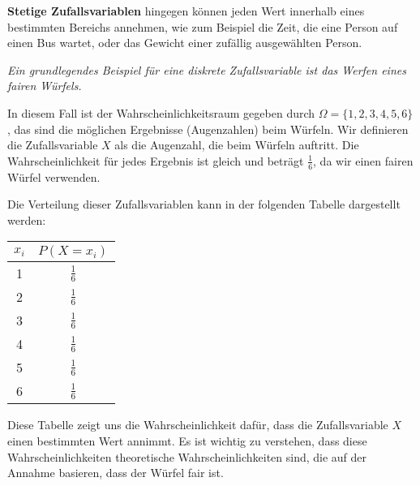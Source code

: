 \textbf{Stetige Zufallsvariablen} hingegen können jeden Wert innerhalb eines bestimmten Bereichs annehmen, wie zum Beispiel die Zeit, die eine Person auf einen Bus wartet, oder das Gewicht einer zufällig ausgewählten Person.

\textit{Ein grundlegendes Beispiel für eine diskrete Zufallsvariable ist das Werfen eines fairen Würfels.}

In diesem Fall ist der Wahrscheinlichkeitsraum gegeben durch $\Omega = \{1, 2, 3, 4, 5, 6\}$, das sind die möglichen Ergebnisse (Augenzahlen) beim Würfeln. Wir definieren die Zufallsvariable $X$ als die Augenzahl, die beim Würfeln auftritt. Die Wahrscheinlichkeit für jedes Ergebnis ist gleich und beträgt $\frac{1}{6}$, da wir einen fairen Würfel verwenden.

Die Verteilung dieser Zufallsvariablen kann in der folgenden Tabelle dargestellt werden:

\begin{center}
    \begin{tabular}{c|c}
        $x_i$ & $P(X = x_i)$  \\
        \hline
        1     & $\frac{1}{6}$ \\
        2     & $\frac{1}{6}$ \\
        3     & $\frac{1}{6}$ \\
        4     & $\frac{1}{6}$ \\
        5     & $\frac{1}{6}$ \\
        6     & $\frac{1}{6}$ \\
    \end{tabular}
\end{center}

Diese Tabelle zeigt uns die Wahrscheinlichkeit dafür, dass die Zufallsvariable $X$ einen bestimmten Wert annimmt. Es ist wichtig zu verstehen, dass diese Wahrscheinlichkeiten theoretische Wahrscheinlichkeiten sind, die auf der Annahme basieren, dass der Würfel fair ist.